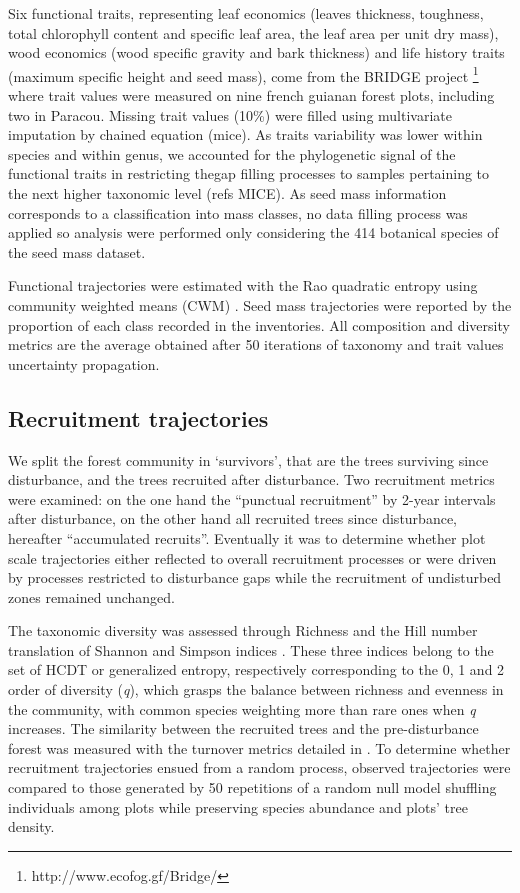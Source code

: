 \documentclass[fleqn,10pt]{ArtEcoFoG} %
\begin{document}
Six functional traits, representing leaf economics (leaves thickness,
toughness, total chlorophyll content and specific leaf area, the leaf
area per unit dry mass), wood economics (wood specific gravity and bark
thickness) and life history traits (maximum specific height and seed
mass), come from the BRIDGE project \footnote{http://www.ecofog.gf/Bridge/}
where trait values were measured on nine french guianan forest plots,
including two in Paracou. Missing trait values (10\%) were filled using
multivariate imputation by chained equation (mice). As traits
variability was lower within species and within genus, we accounted for
the phylogenetic signal of the functional traits in restricting thegap
filling processes to samples pertaining to the next higher taxonomic
level (refs MICE). As seed mass information corresponds to a
classification into mass classes, no data filling process was applied so
analysis were performed only considering the 414 botanical species of
the seed mass dataset.

Functional trajectories were estimated with the Rao quadratic entropy
using community weighted means (CWM) \citep{Diaz2007, Garnier2004}. Seed
mass trajectories were reported by the proportion of each class recorded
in the inventories. All composition and diversity metrics are the
average obtained after 50 iterations of taxonomy and trait values
uncertainty propagation.

\subsection{Recruitment trajectories}\label{recruitment-trajectories}

We split the forest community in `survivors', that are the trees
surviving since disturbance, and the trees recruited after disturbance.
Two recruitment metrics were examined: on the one hand the ``punctual
recruitment'' by 2-year intervals after disturbance, on the other hand
all recruited trees since disturbance, hereafter ``accumulated
recruits''. Eventually it was to determine whether plot scale
trajectories either reflected to overall recruitment processes or were
driven by processes restricted to disturbance gaps while the recruitment
of undisturbed zones remained unchanged.

The taxonomic diversity was assessed through Richness and the Hill
number translation of Shannon and Simpson indices
\citep{Hill1973, chao2015estimating, Marcon2015b}. These three indices
belong to the set of HCDT or generalized entropy, respectively
corresponding to the 0, 1 and 2 order of diversity (\emph{q}), which
grasps the balance between richness and evenness in the community, with
common species weighting more than rare ones when \emph{q} increases.
The similarity between the recruited trees and the pre-disturbance
forest was measured with the turnover metrics detailed in
\citet{Podani2013a}. To determine whether recruitment trajectories
ensued from a random process, observed trajectories were compared to
those generated by 50 repetitions of a random null model shuffling
individuals among plots while preserving species abundance and plots'
tree density.
\end{document}

